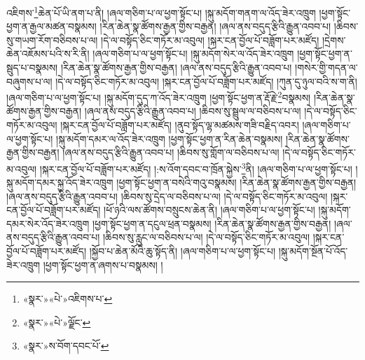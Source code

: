 འཇིགས་\footnote{«སྣར་»«པེ་»འཇིགས་པ་}ཆེན་པོ་ཡི་ནག་པ་ནི། །ཞལ་གཅིག་པ་ལ་ཕྱག་སྟོང་པ། །སྐུ་མདོག་གནག་ལ་འོད་ཟེར་འཁྲུག །ཕྱག་སྟོང་ཕྱག་ན་རྒྱལ་མཚན་བསྣམས། །རིན་ཆེན་སྣ་ཚོགས་རྒྱན་གྱིས་བརྒྱན། །ཞལ་ནས་བདུད་རྩིའི་རྒྱུན་འབབ་པ། །ཆིབས་སུ་གཡག་རོག་བཅིབས་པ་ལ། །དེ་ལ་བསྟོད་ཅིང་གཏོར་མ་འབུལ། །སྐར་ངན་བྱོལ་པོ་བཟློག་པར་མཛོད། །དྲེགས་ཆེན་འཇོམས་པའི་ས་རི་ནི། །ཞལ་གཅིག་པ་ལ་ཕྱག་སྟོང་པ། །སྐུ་མདོག་སེར་ལ་འོད་ཟེར་འཁྲུག །ཕྱག་སྟོང་ཕྱག་ན་སྦུད་པ་བསྣམས། །རིན་ཆེན་སྣ་ཚོགས་རྒྱན་གྱིས་བརྒྱན། །ཞལ་ནས་བདུད་རྩིའི་རྒྱུན་འབབ་པ། །གསེར་གྱི་གདན་ལ་བཞུགས་པ་ལ། །དེ་ལ་བསྟོད་ཅིང་གཏོར་མ་འབུལ། །སྐར་ངན་བྱོལ་པོ་བཟློག་པར་མཛོད། །ཀུན་དུ་ཉུལ་བའི་ས་ག་ནི། །ཞལ་གཅིག་པ་ལ་ཕྱག་སྟོང་པ། །སྐུ་མདོག་དུད་ཀ་འོད་ཟེར་འཁྲུག །ཕྱག་སྟོང་ཕྱག་ན་རྡོ་རྗེ་\footnote{«སྣར་»«པེ་»ལྗོང་}བསྣམས། །རིན་ཆེན་སྣ་ཚོགས་རྒྱན་གྱིས་བརྒྱན། །ཞལ་ནས་བདུད་རྩིའི་རྒྱུན་འབབ་པ། །ཆིབས་སུ་སྦྲུལ་ལ་བཅིབས་པ་ལ། །དེ་ལ་བསྟོད་ཅིང་གཏོར་མ་འབུལ། །སྐར་ངན་བྱོལ་པོ་བཟློག་པར་མཛོད། །ནུབ་སྟོད་ལྷ་མཚམས་གཟི་བརྗིད་འབར། །ཞལ་གཅིག་པ་ལ་ཕྱག་སྟོང་པ། །སྐུ་མདོག་དམར་ལ་འོད་ཟེར་འཁྲུག །ཕྱག་སྟོང་ཕྱག་ན་རིན་ཆེན་བསྣམས། །རིན་ཆེན་སྣ་ཚོགས་རྒྱན་གྱིས་བརྒྱན། །ཞལ་ནས་བདུད་རྩིའི་རྒྱུན་འབབ་པ། །ཆིབས་སུ་གློག་ལ་བཅིབས་པ་ལ། །དེ་ལ་བསྟོད་ཅིང་གཏོར་མ་འབུལ། །སྐར་ངན་བྱོལ་པོ་བཟློག་པར་མཛོད། །:ས་འོག་དབང་བ་ཁྲོན་སྐྱེས་\footnote{«སྣར་»ས་བོག་དབང་པོ་}ནི། །ཞལ་གཅིག་པ་ལ་ཕྱག་སྟོང་པ། །སྐུ་མདོག་དམར་སྐྱ་འོད་ཟེར་འཁྲུག །ཕྱག་སྟོང་ཕྱག་ན་བསེའི་གའུ་བསྣམས། །རིན་ཆེན་སྣ་ཚོགས་རྒྱན་གྱིས་བརྒྱན། །ཞལ་ནས་བདུད་རྩིའི་རྒྱུན་འབབ་པ། །ཆིབས་སུ་དྲེད་ལ་བཅིབས་པ་ལ། །དེ་ལ་བསྟོད་ཅིང་གཏོར་མ་འབུལ། །སྐར་ངན་བྱོལ་པོ་བཟློག་པར་མཛོད། །ཕོ་ཉའི་ལས་ཚོགས་བསྲུངས་ཆེན་ནི། །ཞལ་གཅིག་པ་ལ་ཕྱག་སྟོང་པ། །སྐུ་མདོག་དམར་སེར་འོད་ཟེར་འཁྲུག །ཕྱག་སྟོང་ཕྱག་ན་དངུལ་ཕྲན་བསྣམས། །རིན་ཆེན་སྣ་ཚོགས་རྒྱན་གྱིས་བརྒྱན། །ཞལ་ནས་བདུད་རྩིའི་རྒྱུན་འབབ་པ། །ཆིབས་སུ་རླུང་ལ་བཅིབས་པ་ལ། །དེ་ལ་བསྟོད་ཅིང་གཏོར་མ་འབུལ། །སྐར་ངན་བྱོལ་པོ་བཟློག་པར་མཛོད། །སྐྱོབ་པ་ཆེན་མོའི་ཆུ་སྟོད་ནི། །ཞལ་གཅིག་པ་ལ་ཕྱག་སྟོང་པ། །སྐུ་མདོག་སྔོན་པོ་འོད་ཟེར་འཁྲུག །ཕྱག་སྟོང་ཕྱག་ན་ཞགས་པ་བསྣམས། །
